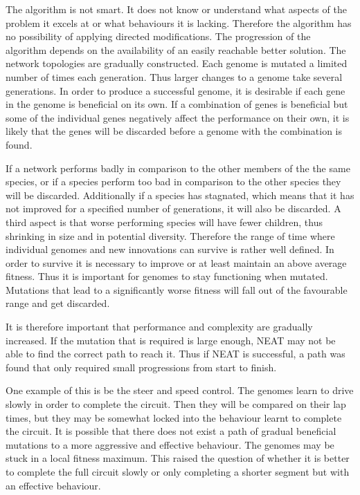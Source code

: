 The algorithm is not smart. It does not know or understand what aspects of the problem it excels at or what behaviours it is lacking. Therefore the algorithm has no possibility of applying directed modifications. The progression of the algorithm depends on the availability of an easily reachable better solution. The network topologies are gradually constructed. Each genome is mutated a limited number of times each generation. Thus larger changes to a genome take several generations. In order to produce a successful genome, it is desirable if each gene in the genome is beneficial on its own. If a combination of genes is beneficial but some of the individual genes negatively affect the performance on their own, it is likely that the genes will be discarded before a genome with the combination is found.

If a network performs badly in comparison to the other members of the the same species, or if a species perform too bad in comparison to the other species they will be discarded\cite{stanley:neat}. Additionally if a species has stagnated, which means that it has not improved for a specified number of generations, it will also be discarded. A third aspect is that worse performing species will have fewer children, thus shrinking in size and in potential diversity. Therefore the range of time where individual genomes and new innovations can survive is rather well defined. In order to survive it is necessary to improve or at least maintain an above average fitness. Thus it is important for genomes to stay functioning when mutated. Mutations that lead to a significantly worse fitness will fall out of the favourable range and get discarded. 

It is therefore important that performance and 
complexity are gradually increased. If the mutation that is required is large enough, NEAT may not be able to find the correct path to reach it. Thus if NEAT is successful, a path was found that only required small progressions from start to finish.

One example of this is be the steer and speed control. The genomes learn to drive slowly in order to complete the circuit. Then they will be compared on their lap times, but they may be somewhat locked into the behaviour learnt to complete the circuit. It is possible that there does not exist a path of gradual beneficial mutations to a more aggressive and effective behaviour. The genomes may be stuck in a local fitness maximum. This raised the question of whether it is better to complete the full circuit slowly or only completing a shorter segment but with an effective behaviour.

